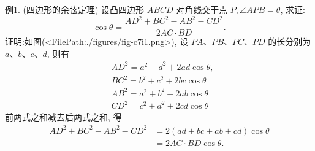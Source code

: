 例1. (四边形的余弦定理) 设凸四边形 $A B C D$ 对角线交于点 $P, \angle A P B= \theta$, 求证:
$$
\cos \theta=\frac{A D^2+B C^2-A B^2-C D^2}{2 A C \cdot B D} .
$$
证明:如图(<FilePath:./figures/fig-c7i1.png>), 设 $P A 、 P B 、 P C 、 P D$ 的长分别为 $a 、 b 、 c 、 d$, 则有
$$
\begin{aligned}
& A D^2=a^2+d^2+2 a d \cos \theta, \\
& B C^2=b^2+c^2+2 b c \cos \theta \\
& A B^2=a^2+b^2-2 a b \cos \theta \\
& C D^2=c^2+d^2+2 c d \cos \theta
\end{aligned}
$$
前两式之和减去后两式之和, 得
$$
\begin{aligned}
A D^2+B C^2-A B^2-C D^2 & =2(a d+b c+a b+c d) \cos \theta \\
& =2 A C \cdot B D \cos \theta .
\end{aligned}
$$



